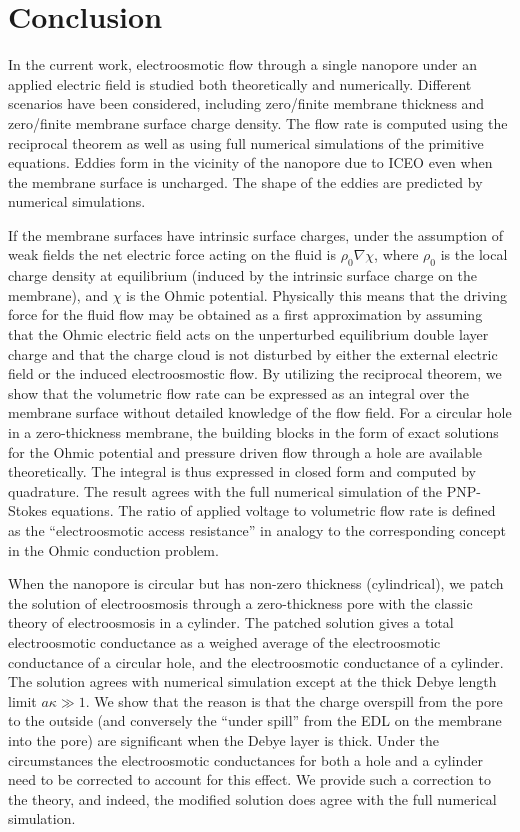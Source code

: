 \chapter{Conclusion}\label{chpt:conclusion}
In the current work, electroosmotic flow through a single nanopore under an applied electric field is studied both theoretically and numerically. Different scenarios have been considered, including zero/finite membrane thickness and zero/finite 
membrane surface charge density. The flow rate is computed using the reciprocal theorem as well as using full numerical simulations of the primitive equations. Eddies form in the vicinity of the nanopore due to ICEO even when the membrane surface is uncharged. The shape of the eddies are predicted by numerical simulations.

If the membrane surfaces have intrinsic surface charges, under the assumption of weak fields the net electric force acting on the fluid is $\rho_0\nabla\chi$, where $\rho_0$ is the local charge density at equilibrium (induced by the intrinsic surface charge on the membrane), and $\chi$ is the Ohmic potential. Physically this means that the driving force for the fluid flow may be obtained as a first approximation by assuming that the Ohmic electric field acts on the unperturbed equilibrium double layer charge and that the charge cloud is not disturbed by either the external electric field or the induced electroosmostic flow. By utilizing the reciprocal theorem, we show that the volumetric flow rate can be expressed as an integral over the membrane surface  without detailed knowledge of the flow field. For a circular hole in a zero-thickness membrane, the building blocks in the form of exact solutions for the Ohmic potential and pressure driven flow through a hole
are available theoretically. The integral is thus expressed in closed form and computed by quadrature. The result agrees with the full numerical simulation of the PNP-Stokes equations. The ratio of applied voltage to volumetric flow rate is defined as the  ``electroosmotic access resistance'' in analogy to the corresponding concept in the Ohmic conduction problem.

When the nanopore is circular but has non-zero thickness (cylindrical), we patch the solution of electroosmosis through a zero-thickness pore with the classic theory of electroosmosis in a cylinder. The patched solution gives a total electroosmotic conductance as a weighed average of the electroosmotic conductance of a circular hole, and the electroosmotic conductance of a cylinder. The solution agrees with numerical simulation except at the thick Debye length limit $a\kappa \gg 1$. We show that the reason is that the charge overspill from the pore to the outside (and conversely the ``under spill'' from the EDL on the membrane into the pore) are significant when the Debye layer is thick. Under the circumstances the electroosmotic conductances for both a hole and a cylinder need to be corrected to account for this effect. We  provide such a correction to  the theory, and indeed, the modified solution does agree with the full numerical simulation.

